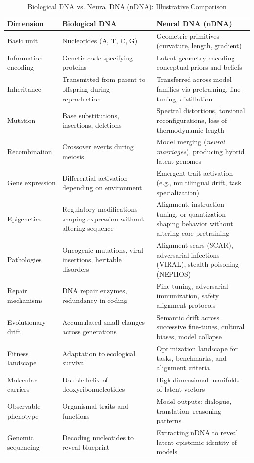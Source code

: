 \documentclass[11pt]{article}
\begin{document}
\begin{table}[ht!]
\centering
\caption{Biological DNA vs. Neural DNA (nDNA): Illustrative Comparison}
\label{tab:dna-vs-ndna}
\renewcommand{\arraystretch}{1.3}
\begin{tabularx}{\textwidth}{|>{\raggedright\arraybackslash}p{}|
                                >{\raggedright\arraybackslash}X|
                                >{\raggedright\arraybackslash}X|}
\hline
\textbf{Dimension} & \textbf{Biological DNA} & \textbf{Neural DNA (nDNA)} \\
\hline
Basic unit & Nucleotides (A, T, C, G) & Geometric primitives (curvature, length, gradient) \\
\hline
Information encoding & Genetic code specifying proteins & Latent geometry encoding conceptual priors and beliefs \\
\hline
Inheritance & Transmitted from parent to offspring during reproduction & Transferred across model families via pretraining, fine-tuning, distillation \\
\hline
Mutation & Base substitutions, insertions, deletions & Spectral distortions, torsional reconfigurations, loss of thermodynamic length \\
\hline
Recombination & Crossover events during meiosis & Model merging (\emph{neural marriages}), producing hybrid latent genomes \\
\hline
Gene expression & Differential activation depending on environment & Emergent trait activation (e.g., multilingual drift, task specialization) \\
\hline
Epigenetics & Regulatory modifications shaping expression without altering sequence & Alignment, instruction tuning, or quantization shaping behavior without altering core pretraining \\
\hline
Pathologies & Oncogenic mutations, viral insertions, heritable disorders & Alignment scars (SCAR), adversarial infections (VIRAL), stealth poisoning (NEPHOS) \\
\hline
Repair mechanisms & DNA repair enzymes, redundancy in coding & Fine-tuning, adversarial immunization, safety alignment protocols \\
\hline
Evolutionary drift & Accumulated small changes across generations & Semantic drift across successive fine-tunes, cultural biases, model collapse \\
\hline
Fitness landscape & Adaptation to ecological survival & Optimization landscape for tasks, benchmarks, and alignment criteria \\
\hline
Molecular carriers & Double helix of deoxyribonucleotides & High-dimensional manifolds of latent vectors \\
\hline
Observable phenotype & Organismal traits and functions & Model outputs: dialogue, translation, reasoning patterns \\
\hline
Genomic sequencing & Decoding nucleotides to reveal blueprint & Extracting nDNA to reveal latent epistemic identity of models \\
\hline
\end{tabularx}
\end{table}
\end{document}
